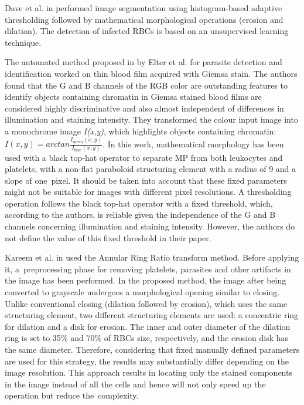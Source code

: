 \documentclass[final,a4paper,12pt,english]{UnicaPhdThesis3}
\begin{document}
Dave et al. in \cite{Dave2017} performed image segmentation using histogram-based adaptive thresholding followed by mathematical morphological operations (erosion and dilation). The detection of infected RBCs is based on an unsupervised learning technique.

The automated method proposed in \cite{Elter2011} by Elter et al. for parasite detection and identification worked on thin blood film acquired with Giemsa stain. The authors found that the G and B channels of the RGB color are outstanding features to identify objects containing chromatin in Giemsa stained blood films are considered highly discriminative and also almost independent of differences in illumination and staining intensity. They transformed the colour input image into a monochrome image \textit{I(x,y)}, which highlights objects containing chromatin: $ I(x,y) = arctan \frac{I_{green}(x,y)}{I_{blue}(x,y)} $. In this work, mathematical morphology has been used with a black top-hat operator to separate MP from both leukocytes and platelets, with a non-flat paraboloid structuring element with a radius of 9 and a slope of one~pixel. It should be taken into account that these fixed parameters might not be suitable for images with different pixel resolutions. A thresholding operation follows the black top-hat operator with a fixed threshold, which, according to the authors, is reliable given the independence of the G and B channels concerning illumination and staining intensity. However, the authors do not define the value of this fixed threshold in their paper.

Kareem et al. in \cite{Kareem2011} used the Annular Ring Ratio transform method. Before applying it, a~preprocessing phase for removing platelets, parasites and other artifacts in the image has been performed. In the proposed method, the image after being converted to grayscale undergoes a morphological opening similar to closing. Unlike conventional closing (dilation followed by erosion), which uses the same structuring element, two different structuring elements are used: a concentric ring for dilation and a disk for erosion. The inner and outer diameter of the dilation ring is set to 35\% and 70\% of RBCs size, respectively, and the erosion disk has the same diameter. Therefore, considering that fixed manually defined parameters are used for this strategy, the results may substantially differ depending on the image resolution. This approach results in locating only the stained components in the image instead of all the cells and hence will not only speed up the operation but reduce the~complexity.
\end{document}
